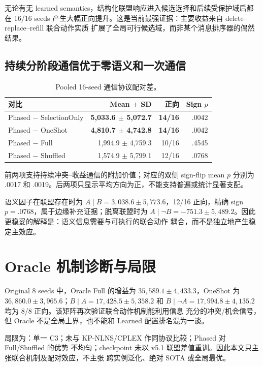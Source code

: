 无论有无 learned semantics，结构化联盟响应进入候选选择和后续受保护域后都在 16/16 seeds
产生大幅正向提升。这是当前最强证据：主要收益来自 delete--replace--refill 联合动作实质
扩展了全局可行候选域，而非某个消息排序器的偶然结果。

\subsection{持续分阶段通信优于零语义和一次通信}

\begin{table}[t]
\caption{Pooled 16-seed 通信协议配对差。}
\label{tab:protocol-effects}
\centering
\small
\begin{tabular}{lrrr}
\toprule
对比 & Mean $\pm$ SD & 正向 & Sign $p$ \\
\midrule
Phased $-$ SelectionOnly & \textbf{5,033.6 $\pm$ 5,072.7} & \textbf{14/16} & .0042 \\
Phased $-$ OneShot & \textbf{4,810.7 $\pm$ 4,742.8} & \textbf{14/16} & .0042 \\
Phased $-$ Full & 1,994.9 $\pm$ 4,759.3 & 10/16 & .4545 \\
Phased $-$ Shuffled & 1,574.9 $\pm$ 5,799.1 & 12/16 & .0768 \\
\bottomrule
\end{tabular}
\end{table}

前两项支持持续冲突--收益通信的附加价值；对应的双侧 sign-flip mean $p$ 分别为 .0017 和
.0019。后两项只显示平均方向为正，不能支持普遍或统计显著支配。

语义因子在联盟存在时为 $A\mid B=3,038.6\pm5,773.6$，12/16 正向，精确 sign
$p=.0768$，属于边缘补充证据；脱离联盟时为
$A\mid\neg B=-751.3\pm5,489.2$。因此更稳妥的解释是：语义信息需要与可执行的联合动作
耦合，而不是独立地产生稳定主效应。

\section{Oracle 机制诊断与局限}

Original 8 seeds 中，Oracle Full 的增益为 $35,589.1\pm4,433.3$，OneShot 为
$36,860.0\pm3,965.6$；$B\mid A=17,428.5\pm5,358.2$ 和
$B\mid\neg A=17,994.8\pm4,135.2$ 均为 8/8 正向。该矩阵再次验证联合动作机制能利用信息
充分的冲突/机会信号，但 Oracle 不是全局上界，也不能和 Learned 配置排名混为一谈。

局限为：单一 C3；未与 KP-NLNS/CPLEX 作同协议比较；Phased 对 Full/Shuffled 的优势
不均匀；checkpoint 未以 v5.1 联盟差值重训。因此本文只主张联合机制及配对效应，不主张
跨实例泛化、绝对 SOTA 或全局最优。
